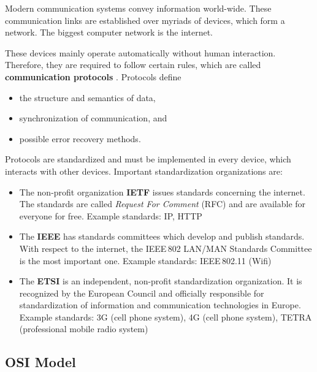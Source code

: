Modern communication systems convey information world-wide. These communication links are established over myriads of devices, which form a network. The biggest computer network is the internet.

These devices mainly operate automatically without human interaction. Therefore, they are required to follow certain rules, which are called \textbf{communication protocols} . Protocols define
\begin{itemize}
	\item the structure and semantics of data,
	\item synchronization of communication, and
	\item possible error recovery methods.
\end{itemize}

Protocols are standardized and must be implemented in every device, which interacts with other devices. Important standardization organizations are:
\begin{itemize}
	\item The non-profit organization \textbf{\acf{IETF}} issues standards concerning the internet. The standards are called \emph{Request For Comment} (RFC) and are available for everyone for free. Example standards: \ac{IP}, \ac{HTTP}
	\item The \textbf{\acf{IEEE}} has standards committees which develop and publish standards. With respect to the internet, the IEEE\,802 LAN/MAN Standards Committee is the most important one. Example standards: IEEE\,802.11 (Wifi)
	\item The \textbf{\acf{ETSI}} is an independent, non-profit standardization organization. It is recognized by the European Council and officially responsible for standardization of information and communication technologies in Europe. Example standards: 3G (cell phone system), 4G (cell phone system), TETRA (professional mobile radio system)
\end{itemize}


\subsection{\acs{OSI} Model}

